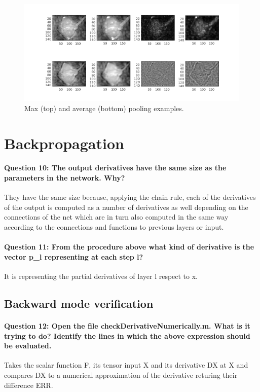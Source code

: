 \documentclass[12pt]{article}
\begin{document}
\begin{figure}[htbp]
 \centering
 \includegraphics[width=\textwidth]{max}
 \caption{Max (top) and average (bottom) pooling examples.}
 \label{fig:max}
\end{figure}

\section{Backpropagation}

\paragraph{Question 10: The output derivatives have the same size as the parameters in the network. Why?} They have the same size because, applying the chain rule, each of the derivatives of the output is computed as a number of derivatives as well depending on the connections of the net which are in turn also computed in the same way according to the connections and functions to previous layers or input.
\paragraph{Question 11: From the procedure above what kind of derivative is the vector p\_l representing at each step l?} It is representing the partial derivatives of layer l respect to x.

\subsection{Backward mode verification}
\paragraph{Question 12: Open the file checkDerivativeNumerically.m. What is it trying to do? Identify the lines in which the above expression should be evaluated.} Takes the scalar function F, its tensor input X and its derivative DX at X and compares DX to a numerical approximation of the derivative returing their difference ERR.
\end{document}
